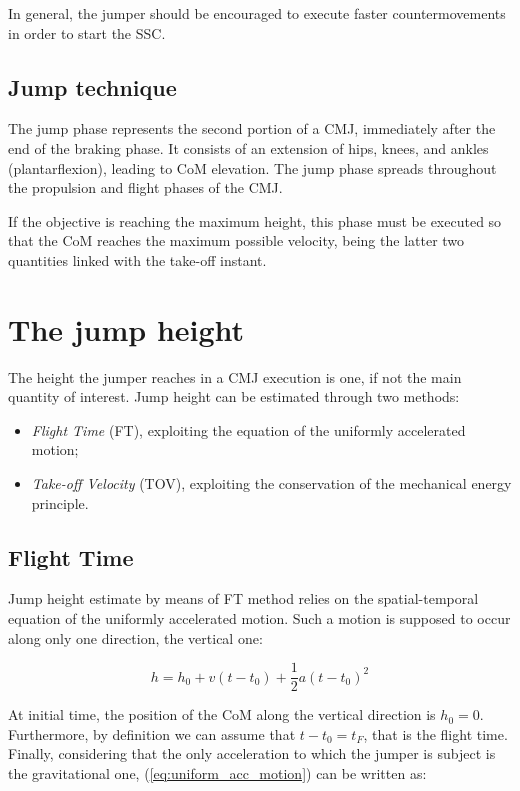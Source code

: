 In general, the jumper should be encouraged to execute faster countermovements in order to start the SSC. 

\subsection{Jump technique}
The jump phase represents the second portion of a CMJ, immediately after the end of the braking phase. It consists of an extension of hips, knees, and ankles (plantarflexion), leading to CoM elevation. The jump phase spreads throughout the propulsion and flight phases of the CMJ. 

If the objective is reaching the maximum height, this phase must be executed so that the CoM reaches the maximum possible velocity, being the latter two quantities linked with the take-off instant. 

\section{The jump height}
The height the jumper reaches in a CMJ execution is one, if not the main quantity of interest. Jump height can be estimated through two methods:

\begin{itemize}
	\item \textit{Flight Time} (FT), exploiting the equation of the uniformly accelerated motion;
	\item \textit{Take-off Velocity} (TOV), exploiting the conservation of the mechanical energy principle.
\end{itemize}

\subsection{Flight Time}
Jump height estimate by means of FT method relies on the spatial-temporal equation of the uniformly accelerated motion. Such a motion is supposed to occur along only one direction, the vertical one:

\begin{equation}\label{eq:uniform_acc_motion}
	h = h_{0} + v(t - t_{0}) + \frac{1}{2} a(t - t_{0})^2
\end{equation}

At initial time, the position of the CoM along the vertical direction is $h_0 = 0$. Furthermore, by definition we can assume that $t - t_0 = t_{F}$, that is the flight time. Finally, considering that the only acceleration to which the jumper is subject is the gravitational one, (\ref{eq:uniform_acc_motion}) can be written as:

